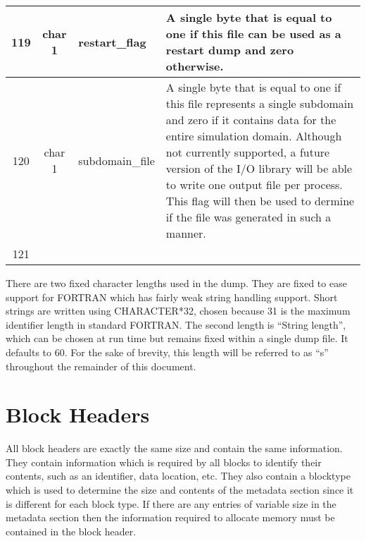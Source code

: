 \documentclass[12pt]{article}
\begin{document}
\begin{center}
\begin{tabularx}{0.9\textwidth}[!hbt]{cclX}
  119 & char 1 & restart\_flag & A single byte that is equal to one if this
  file can be used as a restart dump and zero otherwise.
  \\\midrule

  120 & char 1 & subdomain\_file & A single byte that is equal to one if this
  file represents a single subdomain and zero if it contains data for the
  entire simulation domain. Although not currently supported, a future version
  of the I/O library will be able to write one output file per process. This
  flag will then be used to dermine if the file was generated in such a manner.
  \\\midrule

  121 &
\end{tabularx}
\end{center}\vspace{10pt}

There are two fixed character lengths used in the dump. They are fixed to
ease support for FORTRAN which has fairly weak string handling support.
Short strings are written using CHARACTER*32, chosen because 31 is the
maximum identifier length in standard FORTRAN. The second length is
``String length'', which can be chosen at run time but remains fixed
within a single dump file. It defaults to 60.
For the sake of brevity, this length will be referred to as ``s'' throughout
the remainder of this document.

\section{Block Headers}
All block headers are exactly the same size and contain the same information.
They contain information which is required by all blocks to identify
their contents, such as an identifier, data location, etc.
They also contain a blocktype which is used to determine the size and contents
of the metadata section since it is different for each block type.
If there are any entries of variable size in the metadata section then the
information required to allocate memory must be contained in the block header.\\
\end{document}

